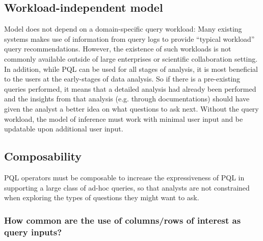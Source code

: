 \documentclass{sig-alternate-05-2015}
\begin{document}
\subsection{Workload-independent model} Model does not depend on a domain-specific query workload: Many existing systems makes use of information from query logs to provide ``typical workload'' query recommendations\cite{Morton2014,Kamat2016,Khoussainova2010}. However, the existence of such workloads is not commonly available outside of large enterprises or scientific collaboration setting. In addition, while PQL can be used for all stages of analysis, it is most beneficial to the users at the early-stages of data analysis. So if there is a pre-existing queries performed, it means that a detailed analysis had already been performed and the insights from that analysis (e.g. through documentations) should have given the analyst a better idea on what questions to ask next. Without the query workload, the model of inference must work with minimal user input and be updatable upon additional user input.
\subsection{Composability} PQL operators must be composable to increase the expressiveness of PQL in supporting a large class of ad-hoc queries, so that analysts are not constrained when exploring the types of questions they might want to ask.
\subsubsection{How common are the use of columns/rows of interest as query inputs?} 
\end{document}
